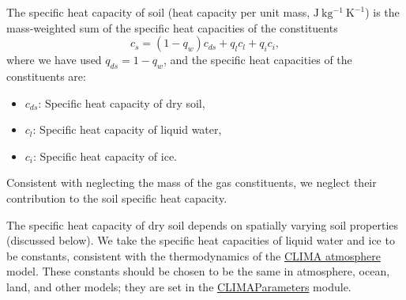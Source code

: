 \documentclass[twoside,10pt]{report}
\begin{document}
The specific heat capacity of soil (heat capacity per unit mass, $\mathrm{J~kg^{-1}~K^{-1}}$) is the mass-weighted sum of the specific heat capacities of the constituents
\begin{equation}\label{e:soil_specific_heat}
    c_s = (1-q_w) c_{ds} + q_l c_{l} + q_i c_{i},
\end{equation}
where we have used $q_{ds} = 1 - q_w$, and the specific heat capacities of the constituents are:
\begin{itemize}
    \item $c_{ds}$: Specific heat capacity of dry soil,
    \item $c_l$: Specific heat capacity of liquid water,
    \item $c_i$: Specific heat capacity of ice.
\end{itemize}
Consistent with neglecting the mass of the gas constituents, we neglect their contribution to the soil specific heat capacity.

The specific heat capacity of dry soil depends on spatially varying soil properties (discussed below). We take the specific heat capacities of liquid water and ice to be constants, consistent with the thermodynamics of the  \href{https://github.com/climate-machine/Design-Docs/blob/master/CLIMA-atmos/}{CLIMA atmosphere} model. These constants should be chosen to be the same in atmosphere, ocean, land, and other models; they are set in the \href{https://github.com/CliMA/CLIMAParameters.jl}{CLIMAParameters} module.
\end{document}
